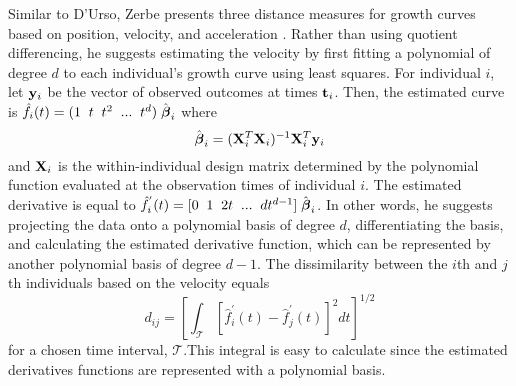 Similar to D'Urso, Zerbe presents three distance measures for growth curves based on position, velocity, and acceleration \cite{zerbe1979,schneiderman1993}. Rather than using quotient differencing, he suggests estimating the velocity by first fitting a polynomial of degree $d$ to each individual's growth curve using least squares. For individual $i$, let $\mathbf y_{i}$ be the vector of observed outcomes at times $\mathbf t_{i}$. Then, the estimated curve is $\hat{f}_{i}(t) = (1\;\; t\;\;t^{2}\;\;...\;\;t^{d})\;\hat{\boldsymbol\beta}_{i}$ where 
$$\hat{\boldsymbol\beta}_{i} = (\mathbf X^{T}_{i}\mathbf X_{i})^{-1}\mathbf X^{T}_{i}\mathbf y_{i}$$
and $\mathbf X_{i}$ is the within-individual design matrix determined by the polynomial function evaluated at the observation times of individual $i$. The estimated derivative is equal to
$\hat{f}_{i}^{'}(t) = [0\;\; 1\;\;2t\;\;...\;\;dt^{d-1}]\;\hat{\boldsymbol\beta}_{i}$. In other words, he suggests projecting the data onto a polynomial basis of degree $d$, differentiating the basis, and calculating the estimated derivative function, which can be represented by another polynomial basis of degree $d-1$. The dissimilarity between the $i$th and $j$th individuals based on the velocity equals
$$d_{ij} =\left[ \int_{\mathcal{T}} [\hat{f}^{'}_{i}(t)-\hat{f}^{'}_{j}(t)]^{2}dt\right]^{1/2}$$
for a chosen time interval, $\mathcal{T}$.This integral is easy to calculate since the estimated derivatives functions are represented with a polynomial basis.

